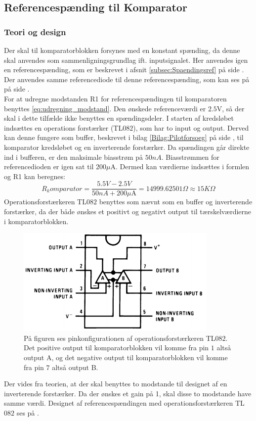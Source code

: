 \subsection{Referencespænding til Komparator}\label{subsec:Spaendingsref_Komparator}
\subsubsection{Teori og design}
Der skal til komparatorblokken forsynes med en konstant spænding, da denne skal anvendes som sammenligningsgrundlag ift. inputsignalet. Her anvendes igen en referencespænding, som er beskrevet i afsnit \ref{subsec:Spaendingsref} på side \pageref{subsec:Spaendingsref}. Der anvendes samme referencediode til denne referencespænding, som kan ses på  på side \pageref{subsec:Spaendingsref}. \\
For at udregne modstanden R1 for referencespændingen til komparatoren benyttes \eqref{eq:udregning_modstand}. Den ønskede referenceværdi er $2.5$V, så der skal i dette tilfælde ikke benyttes en spændingsdeler. I starten af kredsløbet indsættes en operations forstærker (TL$082$), som har to input og output. \cite{Corporation2013} Derved kan denne fungere som buffer, beskrevet i bilag \ref{Bilag:Pilotforsoeg} på side \pageref{Bilag:Pilotforsoeg}, til komparator kredsløbet og en inverterende forstærker.\cite{Schaumann2014} Da spændingen går direkte ind i bufferen, er den maksimale biasstrøm på $50nA$. Biasstrømmen for referencedioden er igen sat til $200\mu$A. Dermed kan værdierne indsættes i formlen og R1 kan beregnes:
\begin{equation}
R_komparator = \frac{5.5V-2.5V}{50nA + 200\mu\text{A}} = 14999.62501\Omega \approx 15K\Omega 
\end{equation} 
Operationsforstærkeren TL$082$ benyttes som nævnt som en buffer og inverterende forstærker, da der både ønskes et positivt og negativt output til tærskelværdierne i komparatorblokken.
\begin{figure}[H]
	\centering
	\includegraphics[scale=0.65]{figures/cProblemloesning/TL082.PNG}
	\caption{På figuren ses pinkonfigurationen af operationsforstærkeren TL$082$. Det positive output til komparatorblokken vil komme fra pin $1$ altså output A, og det negative output til komparatorblokken vil komme fra pin $7$ altså output B. \cite{Corporation2013}}
	\label{fig:TL082}
\end{figure}
\noindent Der vides fra teorien, at der skal benyttes to modstande til designet af en inverterende forstærker. Da der ønskes et gain på 1, skal disse to modstande have samme værdi. \cite{Nilsson2011} Designet af referencespændingen med operationsforstærkeren TL$082$ ses på .

